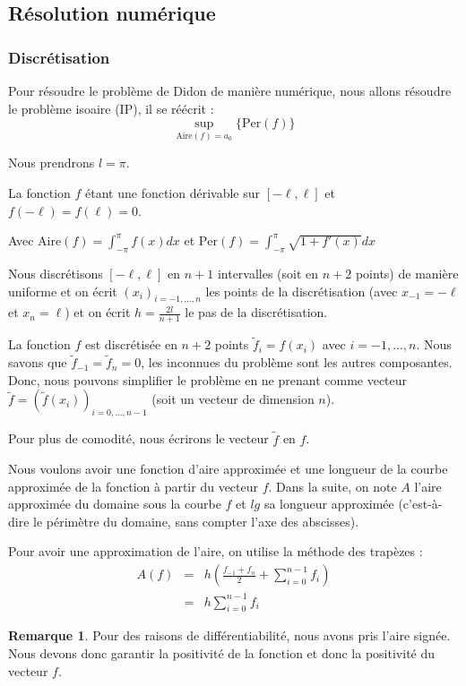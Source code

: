 \documentclass[10pt,a4paper]{article}
\newcommand{\A}{\mathrm{Aire}}
\newcommand{\p}{\mathrm{Per}}
\newcommand{\IP}{\textsf{IP}}
\renewcommand{\ss}{\vspace*{\baselineskip}}
\theoremstyle{plain}
\theoremstyle{definition}
\newtheorem{rem}[thm]{Remarque}
\begin{document}
\subsection{Résolution numérique}

\subsubsection{Discrétisation}

Pour résoudre le problème de Didon de manière numérique, nous allons résoudre le problème isoaire (\IP), il se réécrit :
\[ \sup_{\A(f)=a_0} \{ \p(f) \} \]

Nous prendrons $l = \pi$.

La fonction $f$ étant une fonction dérivable sur $[-\ell, \ell]$ et $f(-\ell)=f(\ell)=0$.

Avec $\A(f) = \int_{-\pi}^{\pi}{f(x)}dx$ et $\p(f) = \int_{-\pi}^{\pi}{\sqrt{1+f'(x)}dx}$

Nous discrétisons $[-\ell, \ell]$ en $n+1$ intervalles (soit en $n+2$ points) de manière uniforme et on écrit $(x_i)_{i=-1,...,n}$ les points de la discrétisation (avec  $x_{-1}=-\ell$ et $x_n=\ell$) et on écrit $h=\frac{2l}{n+1}$ le pas de la discrétisation.

La fonction $f$ est discrétisée en $n+2$ points $\tilde{f}_i = f(x_i)$ avec $i=-1,...,n$. Nous savons que $\tilde{f}_{-1} = \tilde{f}_n = 0$, les inconnues du problème sont les autres composantes. Donc, nous pouvons simplifier le problème en ne prenant comme vecteur $\tilde{f} = (\tilde{f}(x_i))_{i=0,...,n-1}$ (soit un vecteur de dimension $n$).

Pour plus de comodité, nous écrirons le vecteur $\tilde{f}$ en $f$.

\ss

Nous voulons avoir une fonction d'aire approximée et une longueur de la courbe approximée de la fonction à partir du vecteur $f$. Dans la suite, on note $A$ l'aire approximée du domaine sous la courbe $f$ et $lg$ sa longueur approximée (c'est-à-dire le périmètre du domaine, sans compter l'axe des abscisses).

Pour avoir une approximation de l'aire, on utilise la méthode des trapèzes :
\begin{eqnarray*}
A(f) &=& h \left(\frac{f_{-1}+f_n}{2} + \sum_{i=0}^{n-1}{f_i}\right) \\
&=& h \sum_{i=0}^{n-1}{f_i}
\end{eqnarray*}

\begin{rem}
Pour des raisons de différentiabilité, nous avons pris l'aire signée. Nous devons donc garantir la positivité de la fonction et donc la positivité du vecteur $f$.
\end{rem}
\end{document}
